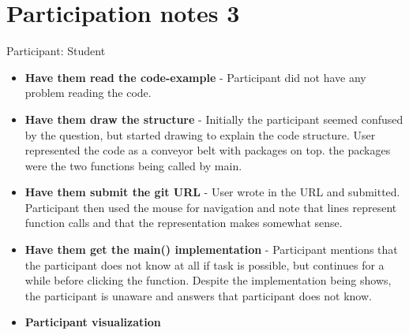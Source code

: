 \section{Participation notes 3}
Participant: Student

\begin{itemize}
    \item \textbf{Have them read the code-example} - Participant did not have any problem reading the code.
    \item \textbf{Have them draw the structure} - Initially the participant seemed confused by the question, but started drawing to explain the code structure. User represented the code as a conveyor belt with packages on top. the packages were the two functions being called by main. 
    \item \textbf{Have them submit the git URL} - User wrote in the URL and submitted. Participant then used the mouse for navigation and note that lines represent function calls and that the representation makes somewhat sense. 
    \item \textbf{Have them get the main() implementation} - Participant mentions that the participant does not know at all if task is possible, but continues for a while before clicking the function. Despite the implementation being shows, the participant is unaware and answers that participant does not know.
    \item \textbf{Participant visualization} 
\end{itemize}